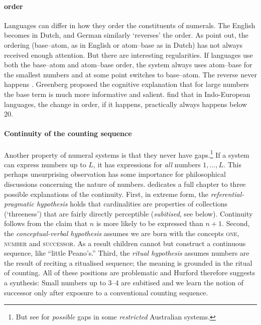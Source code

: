 \documentclass{../src/bcthesispart}
\begin{document}
\paragraph{order}

Languages can differ in how they order the constituents of numerals.
The English  becomes  in Dutch, and German similarly ‘reverses’ the order.
As \textcite{Calude2016} point out, the ordering (base--atom, as in English or atom--base as in Dutch) has not always received enough attention.
But there are interesting regularities.
If languages use both the base--atom and atom--base order, the system always uses atom--base for the smallest numbers and at some point switches to base--atom. The reverse never happens \parencite{Greenberg1978}.
Greenberg proposed the cognitive explanation that for large numbers the base term is much more informative and salient.
\textcite{Calude2016} find that in Indo-European languages, the change in order, if it happens, practically always happens below 20.





\paragraph{Continuity of the counting sequence}

Another property of numeral systems is that they never have gaps.\footnote{%
	But see \textcite{Zhou2015} for \emph{possible} gaps in some \emph{restricted} Australian systems.
	}
If a system can express numbers up to $L$, it has expressions for \emph{all} numbers $1, \dots, L$.
This perhaps unsurprising observation has some importance for philosophical discussions concerning the nature of numbers.
\textcite{Hurford1987} dedicates a full chapter to three possible explanations of the continuity.
First, in extreme form, the \emph{referential-pragmatic hypothesis} holds that cardinalities are properties of collections (‘threeness’) that are fairly directly perceptible (\emph{subitised}, see below).
Continuity follows from the claim that $n$ is more likely to be expressed than $n+1$. 
Second, the \emph{conceptual-verbal hypothesis} assumes we are born with the concepts \textsc{one}, \textsc{number} and \textsc{successor}.
As a result children cannot but construct a continuous sequence, like “little Peano’s.”
Third, the \emph{ritual hypothesis} assumes numbers are the result of reciting a ritualised sequence; the meaning is grounded in the ritual of counting.
All of these positions are problematic and Hurford therefore suggests a synthesis: Small numbers up to 3--4 are subitised and we learn the notion of successor only after exposure to a conventional counting sequence.
\end{document}
